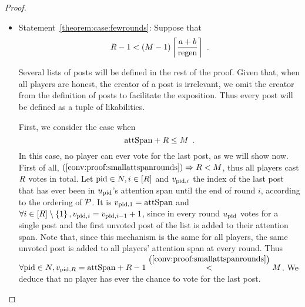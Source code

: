 \begin{proof}
\begin{itemize}
%
    \item Statement~\ref{theorem:case:fewrounds}: Suppose that
    \begin{equation}
      \label{conv:proof:fewrounds}
      \rounds - 1 < \left(\postlen - 1\right)\ceil*{\frac{a+b}{\regen}}
      \enspace.
    \end{equation}

    Several lists of posts will be defined in the rest of the proof. Given that,
    when all players are honest, the creator of a post is irrelevant, we omit
    the creator from the definition of posts to facilitate the exposition. Thus
    every post will be defined as a tuple of likabilities.

    First, we consider the case when
    \begin{equation}
      \label{conv:proof:smallattspanrounds}
      \mathrm{attSpan} + R \leq M \enspace.
    \end{equation}
    In this case, no player can ever vote for the last post, as we will show
    now. First of all, $(\ref{conv:proof:smallattspanrounds}) \Rightarrow
    R < M$, thus all players cast $R$ votes in total. Let
    $\mathrm{pid} \in N, i \in \left[R\right]$ and $v_{\mathrm{pid}, i}$ the
    index of the last post that has ever been in $u_{\mathrm{pid}}$'s attention
    span until the end of round $i$, according to the ordering of $\mathcal{P}$.
    It is $v_{\mathrm{pid}, 1} = \mathrm{attSpan}$ and $\forall i \in \left[R\right]
    \setminus \left\{1\right\}, v_{\mathrm{pid}, i} = v_{\mathrm{pid}, i - 1} + 1$, since in
    every round $u_{\mathrm{pid}}$ votes for a single post and the first unvoted
    post of the list is added to their attention span. Note that, since this
    mechanism is the same for all players, the same unvoted post is added to
    all players' attention span at every round. Thus $\forall \mathrm{pid} \in
    N, v_{\mathrm{pid}, R} = \mathrm{attSpan} + R - 1
    \overset{\left(\ref{conv:proof:smallattspanrounds}\right)}{<} M$.
    We deduce that no player has ever the chance to vote for the last post.


\end{itemize}
\end{proof}
